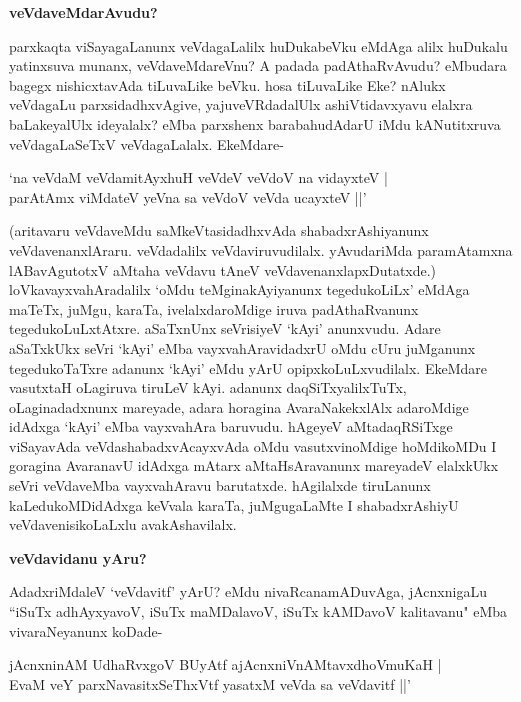 {\bigskip
\noindent
{\large\bf veVdaveMdarAvudu?}}\label{page132}
\medskip

\noindent
parxkaqta viSayagaLanunx veVdagaLalilx huDukabeVku eMdAga alilx huDukalu yatinxsuva munanx, veVda\-veMdareVnu? A padada padAthaRvAvudu? eMbudara bagegx nishicxtavAda tiLuvaLike beVku. hosa tiLu\-vaLike Eke? nAlukx veVdagaLu parxsidadhxvAgive, yajuveVRdadalUlx ashiVtidavxyavu elalxra baLake\-yalUlx ideyalalx? eMba parxshenx barabahudAdarU iMdu kANutitxruva veVdagaLaSeTxV veVdagaLalalx. EkeMdare-

\begin{shloka}
`na veVdaM veVdamitAyxhuH veVdeV veVdoV na vidayxteV |\\\label{132}
parAtAmx viMdateV yeVna sa veVdoV veVda ucayxteV ||'
\end{shloka}

\noindent
(aritavaru veVdaveMdu saMkeVtasidadhxvAda shabadxrAshiyanunx veVdavenanxlAraru. veVdadalilx veVdaviruvu\-dilalx. yAvudariMda paramAtamxna lABavAgutotxV aMtaha veVdavu tAneV veVdavenanxlapxDutatxde.) loVka\-vayxva\-hAradalilx `oMdu teMginakAyiyanunx tegedukoLiLx' eMdAga maTeTx, juMgu, karaTa, ivelalxdaroMdige iruva padAthaRvanunx tegedukoLuLxtAtxre. aSaTxnUnx seVrisiyeV `kAyi' anunxvudu. Adare aSaTxkUkx seVri `kAyi' eMba vayxvahAravidadxrU oMdu cUru juMganunx tegedukoTaTxre adanunx `kAyi' eMdu yArU opipxkoLuLxvudilalx. EkeMdare vasutxtaH oLagiruva tiruLeV kAyi. adanunx daqSiTxyalilxTuTx, oLaginadadxnunx mareyade, adara horagina AvaraNakekxlAlx adaroMdige idAdxga `kAyi' eMba vayxvahAra baruvudu. hAgeyeV aMtadaqRSiTxge viSayavAda veVdashabadxvAcayxvAda oMdu vasutxvinoMdige hoMdikoMDu I goragina AvaranavU idAdxga mAtarx aMtaHsAravanunx mareyadeV elalxkUkx seVri veVdaveMba vayxva\-hAravu barutatxde. hAgilalxde tiruLanunx kaLedukoMDidAdxga keVvala karaTa, juMgugaLaMte I shabadx\-rAshiyU veVda\-venisikoLaLxlu avakAshavilalx.

{\bigskip
\noindent
{\large\bf veVdavidanu yAru?}}\label{page133}
\medskip

\noindent
AdadxriMdaleV `veVdavitf' yArU? eMdu nivaRcanamADuvAga, jAcnxnigaLu ``iSuTx adhAyxyavoV, iSuTx maMDalavoV, iSuTx kAMDavoV kalitavanu" eMba vivaraNeyanunx koDade-

\begin{shloka}
jAcnxninAM UdhaRvxgoV BUyAtf ajAcnxniVnAMtavxdhoVmuKaH |\\\label{133}
EvaM veY parxNavasitxSeThxVtf yasatxM veVda sa veVdavitf ||'
\end{shloka}

